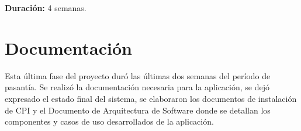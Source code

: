 \textbf{Duración:} 4 semanas.


\section{Documentación} \label{documentation}
Esta última fase del proyecto duró las últimas dos semanas del período de pasantía. Se realizó la documentación necesaria para la aplicación, se dejó expresado el estado final del sistema, se elaboraron los documentos de instalación de CPI y el Documento de Arquitectura de Software donde se detallan los componentes y casos de uso desarrollados de la aplicación.

